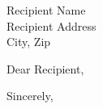 \documentclass[paper=a4,fontsize=11pt,foldmarks=false]{scrlttr2}
\begin{document}
\begin{letter}{Recipient Name \\ Recipient Address \\ City, Zip}

	\opening{Dear Recipient,}

	\lipsum[1]

	\closing{Sincerely,}

\end{letter}
\end{document}
